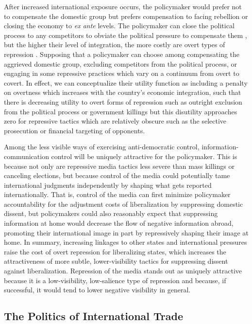 \documentclass[12pt,a4paper]{article}\usepackage[]{graphicx}\usepackage[]{color}
\begin{document}
After increased international exposure occurs, the policymaker would prefer not to compensate the domestic group but prefers compensation to facing rebellion or closing the economy to \emph{ex ante} levels. The policymaker can close the political process to any competitors to obviate the political pressure to compensate them \parencite{Adsera:2002vt}, but the higher their level of integration, the more costly are overt types of repression \parencite{Levitsky:2002gx}. Supposing that a policymaker can choose among compensating the aggrieved domestic group, excluding competitors from the political process, or engaging in some repressive practices which vary on a continuum from overt to covert. In effect, we can conceptualize their utility function as including a penalty on overtness which increases with the country's economic integration, such that there is decreasing utility to overt forms of repression such as outright exclusion from the political process or government killings but this disutility approaches zero for repressive tactics which are relatively obscure such as the selective prosecution or financial targeting of opponents.

Among the less visible ways of exercising anti-democratic control, information-communication control will be uniquely attractive for the policymaker. This is because not only are repressive media tactics less severe than mass killings or canceling elections, but because control of the media could potentially tame international judgments independently by shaping what gets reported internationally. That is, control of the media can first minimize policymaker accountability for the adjustment costs of liberalization by suppressing domestic dissent, but policymakers could also reasonably expect that suppressing information at home would decrease the flow of negative information abroad, promoting their international image in part by repressively shaping their image at home. In summary, increasing linkages to other states and international pressures raise the cost of overt repression for liberalizing states, which increases the attractiveness of more subtle, lower-visibility tactics for suppressing dissent against liberalization. Repression of the media stands out as uniquely attractive because it is a low-visibility, low-salience type of repression and because, if successful, it would tend to lower negative visibility in general.

\subsection{The Politics of International Trade}
\end{document}

